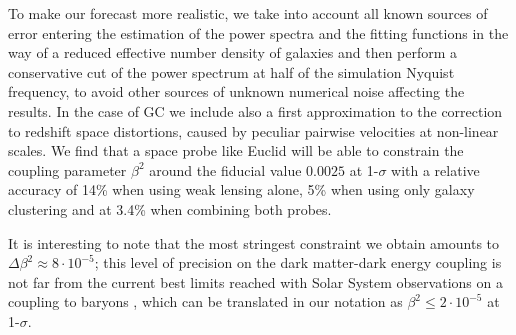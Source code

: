 To make our forecast more realistic, we take into account all known
sources of error entering the estimation of the power spectra and
the fitting functions in the way of a reduced effective number density
of galaxies and then perform a conservative cut of the power spectrum
at half of the simulation Nyquist frequency, to avoid other sources
of unknown numerical noise affecting the results. In the case of GC
we include also a first approximation to the correction to redshift
space distortions, caused by peculiar pairwise velocities at non-linear
scales. We find that a space probe like Euclid will be able to constrain
the coupling parameter $\beta^{2}$ around the fiducial value $0.0025$
at 1-$\sigma$ with a relative accuracy of 14\% when using weak lensing
alone, 5\% when using only galaxy clustering and at 3.4\% when combining
both probes.

It is interesting to note that the most stringest constraint we obtain
amounts to $\Delta\beta^{2}\approx8\cdot10^{-5}$; this level of precision
on the dark matter-dark energy coupling is not far from the current
best limits reached with Solar System observations on a coupling to
baryons \cite{Agashe:2014kda}, which can be translated in our notation
as $\beta^{2}\le2\cdot10^{-5}$ at 1-$\sigma$. 




